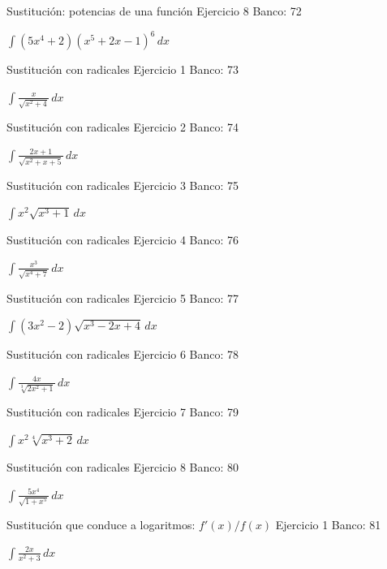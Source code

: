 \documentclass[aspectratio=169,12pt]{beamer}
\newcommand{\ejercicio}[1]{%
  \begin{center}
  \vfill
  {\fontsize{24}{30}\selectfont #1}
  \vfill
  \end{center}
}
\begin{document}
\begin{frame}{Sustitución: potencias de una función}
\small Ejercicio 8 \hfill Banco: 72
\ejercicio{$\displaystyle \int(5x^4+2)(x^5+2x-1)^6\,dx$}
\end{frame}

\begin{frame}{Sustitución con radicales}
\small Ejercicio 1 \hfill Banco: 73
\ejercicio{$\displaystyle \int\frac{x}{\sqrt{x^2+4}}\,dx$}
\end{frame}

\begin{frame}{Sustitución con radicales}
\small Ejercicio 2 \hfill Banco: 74
\ejercicio{$\displaystyle \int\frac{2x+1}{\sqrt{x^2+x+5}}\,dx$}
\end{frame}

\begin{frame}{Sustitución con radicales}
\small Ejercicio 3 \hfill Banco: 75
\ejercicio{$\displaystyle \int x^2\sqrt{x^3+1}\,dx$}
\end{frame}

\begin{frame}{Sustitución con radicales}
\small Ejercicio 4 \hfill Banco: 76
\ejercicio{$\displaystyle \int\frac{x^3}{\sqrt{x^4+7}}\,dx$}
\end{frame}

\begin{frame}{Sustitución con radicales}
\small Ejercicio 5 \hfill Banco: 77
\ejercicio{$\displaystyle \int(3x^2-2)\sqrt{x^3-2x+4}\,dx$}
\end{frame}

\begin{frame}{Sustitución con radicales}
\small Ejercicio 6 \hfill Banco: 78
\ejercicio{$\displaystyle \int\frac{4x}{\sqrt[3]{2x^2+1}}\,dx$}
\end{frame}

\begin{frame}{Sustitución con radicales}
\small Ejercicio 7 \hfill Banco: 79
\ejercicio{$\displaystyle \int x^2\sqrt[4]{x^3+2}\,dx$}
\end{frame}

\begin{frame}{Sustitución con radicales}
\small Ejercicio 8 \hfill Banco: 80
\ejercicio{$\displaystyle \int\frac{5x^4}{\sqrt{1+x^5}}\,dx$}
\end{frame}

\begin{frame}{Sustitución que conduce a logaritmos: $f'(x)/f(x)$}
\small Ejercicio 1 \hfill Banco: 81
\ejercicio{$\displaystyle \int\frac{2x}{x^2+3}\,dx$}
\end{frame}
\end{document}
